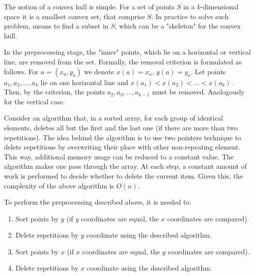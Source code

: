 \documentclass[a4paper,UKenglish,cleveref, autoref]{socg-lipics-v2019}
\begin{document}
	The notion of a convex hull is simple. For a set of points $S$ in a $k$-dimensional space it is a smallest convex set, that comprise $S$. In practice to solve such problem, means to find a subset in $S$, which can be a "skeleton" for the convex hull.
	
	
	
	
	In the preprocessing stage, the "inner" points, which lie on a horizontal or vertical line, are removed from the set. Formally, the removal criterion is formulated as follows. For $a = (x_a, y_a)$ we denote $x(a)=x_a$, $y(a)=y_a$. Let points $a_1, a_2, ..., a_k$ lie on one horizontal line and $x(a_1) < x(a_2) <... <x (a_k) $. Then, by the criterion, the points $a_2, a_3, ..., a_{k-1}$ must be removed. Analogously for the vertical case.
	
	Consider an algorithm that, in a sorted array, for each group of identical elements, deletes all but the first and the last one (if there are more than two repetitions). The idea behind the algorithm is to use two pointers technique to delete repetitions by overwriting their place with other non-repeating element. This way, additional memory usage can be reduced to a constant value. The algorithm makes one pass through the array. At each step, a constant amount of work is performed to decide whether to delete the current item. Given this, the complexity of the above algorithm is $O(n)$.
	
	To perform the preprocessing described above, it is needed to:
	
	\begin{enumerate}
		\item
		Sort points by $y$ (if $y$ coordinates are equal, the $x$ coordinates are compared).
		\item
		Delete repetitions by $y$ coordinate using the described algorithm.
		\item
		Sort points by $x$ (if $x$ coordinates are equal, the $y$ coordinates are compared).
		\item
		Delete repetitions by $x$ coordinate using the described algorithm.
	\end{enumerate}
	
\end{document}
